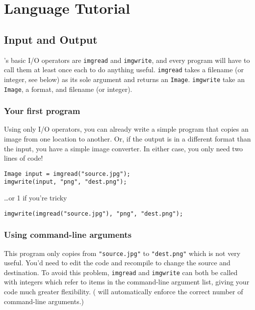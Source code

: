 \chapter{Language Tutorial}
\label{chap:tutorial}

\section{Input and Output}

\sys{}'s basic I/O operators are \texttt{imgread} and \texttt{imgwrite}, and every program
will have to call them at least once each to do anything useful. \texttt{imgread}
takes a filename (or integer, see below) as its sole argument and returns an \texttt{Image}.
\texttt{imgwrite} take an \texttt{Image}, a format, and filename (or integer).

\subsection{Your first program}

Using only I/O operators, you can already write a simple program that copies an image from
one location to another. Or, if the output is in a different format than the input,
you have a simple image converter. In either case, you only need two lines of code!

\begin{lstlisting}[language=CLAM,escapechar=\%]
Image input = imgread("source.jpg");
imgwrite(input, "png", "dest.png");
\end{lstlisting}
\ldots or 1 if you're tricky
\begin{lstlisting}[language=CLAM,escapechar=\%]
imgwrite(imgread("source.jpg"), "png", "dest.png");
\end{lstlisting}

\subsection{Using command-line arguments}

This program only copies from \texttt{"source.jpg"} to \texttt{"dest.png"} which is not
very useful.
You'd need to edit the code and recompile to change the source and destination.
To avoid this problem, \texttt{imgread} and \texttt{imgwrite} can both be called with integers
which refer to items in the command-line argument list, giving your code much greater
flexibility. (\sys{} will automatically enforce the correct number of command-line arguments.)

